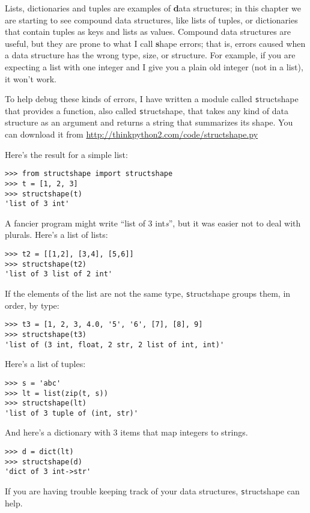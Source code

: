\documentclass[
DIV=11,
fontsize=13,
twoside,
headinclude=false,
titlepage=firstiscover,
abstract=true,
headsepline=true,
footsepline=true,
chapterprefix=true, %
headings=big,
bibliography=totoc,%
captions=tableheading
]{scrbook}
\theoremstyle{definition}
\begin{document}
Lists, dictionaries and tuples are examples of {\textbf data
  structures}; in this chapter we are starting to see compound data
structures, like lists of tuples, or dictionaries that contain tuples
as keys and lists as values.  Compound data structures are useful, but
they are prone to what I call {\textbf shape errors}; that is, errors
caused when a data structure has the wrong type, size, or structure.
For example, if you are expecting a list with one integer and I
give you a plain old integer (not in a list), it won't work.

To help debug these kinds of errors, I have written a module
called {\texttt structshape} that provides a function, also called
{\texttt structshape}, that takes any kind of data structure as
an argument and returns a string that summarizes its shape.
You can download it from \url{http://thinkpython2.com/code/structshape.py}

Here's the result for a simple list:

\begin{lstlisting}
>>> from structshape import structshape
>>> t = [1, 2, 3]
>>> structshape(t)
'list of 3 int'
\end{lstlisting}
%
A fancier program might write ``list of 3 int{\em s}'', but it
was easier not to deal with plurals.  Here's a list of lists:

\begin{lstlisting}
>>> t2 = [[1,2], [3,4], [5,6]]
>>> structshape(t2)
'list of 3 list of 2 int'
\end{lstlisting}
%
If the elements of the list are not the same type,
{\texttt structshape} groups them, in order, by type:

\begin{lstlisting}
>>> t3 = [1, 2, 3, 4.0, '5', '6', [7], [8], 9]
>>> structshape(t3)
'list of (3 int, float, 2 str, 2 list of int, int)'
\end{lstlisting}
%
Here's a list of tuples:

\begin{lstlisting}
>>> s = 'abc'
>>> lt = list(zip(t, s))
>>> structshape(lt)
'list of 3 tuple of (int, str)'
\end{lstlisting}
%
And here's a dictionary with 3 items that map integers to strings.

\begin{lstlisting}
>>> d = dict(lt) 
>>> structshape(d)
'dict of 3 int->str'
\end{lstlisting}
%
If you are having trouble keeping track of your data structures,
{\texttt structshape} can help.
\end{document}

